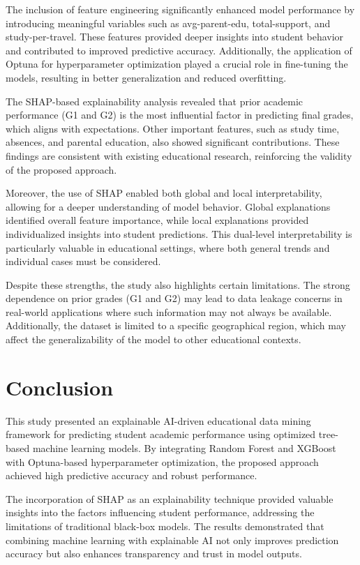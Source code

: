 \documentclass[conference]{IEEEtran}
\begin{document}
The inclusion of feature engineering significantly enhanced model performance by introducing meaningful variables such as avg-parent-edu, total-support, and study-per-travel. These features provided deeper insights into student behavior and contributed to improved predictive accuracy. Additionally, the application of Optuna for hyperparameter optimization played a crucial role in fine-tuning the models, resulting in better generalization and reduced overfitting. 

The SHAP-based explainability analysis revealed that prior academic performance (G1 and G2) is the most influential factor in predicting final grades, which aligns with expectations. Other important features, such as study time, absences, and parental education, also showed significant contributions. These findings are consistent with existing educational research, reinforcing the validity of the proposed approach. 

Moreover, the use of SHAP enabled both global and local interpretability, allowing for a deeper understanding of model behavior. Global explanations identified overall feature importance, while local explanations provided individualized insights into student predictions. This dual-level interpretability is particularly valuable in educational settings, where both general trends and individual cases must be considered. 

Despite these strengths, the study also highlights certain limitations. The strong dependence on prior grades (G1 and G2) may lead to data leakage concerns in real-world applications where such information may not always be available. Additionally, the dataset is limited to a specific geographical region, which may affect the generalizability of the model to other educational contexts. 

\section{Conclusion}
This study presented an explainable AI-driven educational data mining framework for predicting student academic performance using optimized tree-based machine learning models. By integrating Random Forest and XGBoost with Optuna-based hyperparameter optimization, the proposed approach achieved high predictive accuracy and robust performance. 

The incorporation of SHAP as an explainability technique provided valuable insights into the factors influencing student performance, addressing the limitations of traditional black-box models. The results demonstrated that combining machine learning with explainable AI not only improves prediction accuracy but also enhances transparency and trust in model outputs. 
\end{document}
